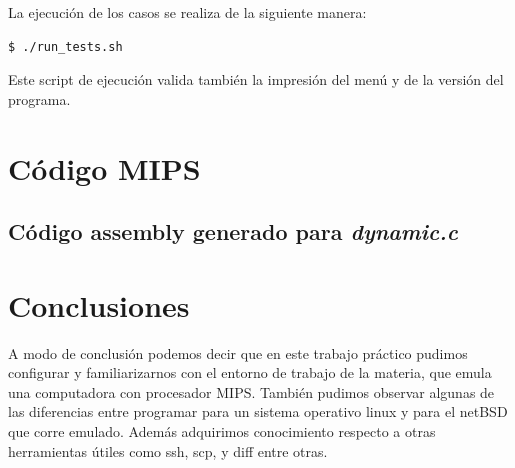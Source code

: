 \documentclass[a4paper,10pt, spanish]{article}
\begin{document}
La ejecución de los casos se realiza de la siguiente manera:

\begin{lstlisting}
$ ./run_tests.sh
\end{lstlisting}

Este script de ejecución valida también la impresión del menú y de la versión del programa.

\section{Código MIPS}

\subsection{Código assembly generado para \textit{dynamic.c}}

 

\section{Conclusiones}

A modo de conclusión podemos decir que en este trabajo práctico pudimos configurar y familiarizarnos con el entorno de trabajo de la materia, que emula una computadora con procesador MIPS. 
También pudimos observar algunas de las diferencias entre programar para un sistema operativo linux y para el netBSD que corre emulado. Además adquirimos conocimiento respecto a otras herramientas útiles como ssh, scp, y diff entre otras.
\end{document}
